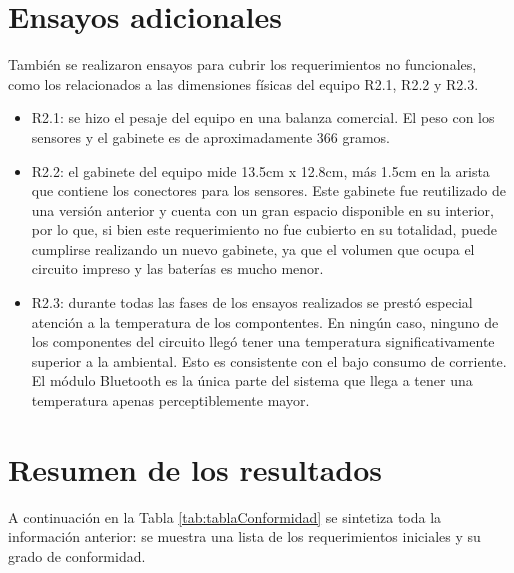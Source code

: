 \section{Ensayos adicionales}

También se realizaron ensayos para cubrir los requerimientos no funcionales, como los relacionados a las dimensiones físicas del equipo R2.1, R2.2 y R2.3. 

\begin{itemize}

\item R2.1: se hizo el pesaje del equipo en una balanza comercial. El peso con los sensores y el gabinete es de aproximadamente 366 gramos. 

\item R2.2: el gabinete del equipo mide 13.5cm x 12.8cm, más 1.5cm en la arista que contiene los conectores para los sensores. Este gabinete fue reutilizado de una versión anterior y cuenta con un gran espacio disponible en su interior, por lo que, si bien este requerimiento no fue cubierto en su totalidad, puede cumplirse realizando un nuevo gabinete, ya que el volumen que ocupa el circuito impreso y las baterías es mucho menor.

\item R2.3: durante todas las fases de los ensayos realizados se prestó especial atención a la temperatura de los compontentes. En ningún caso, ninguno de los componentes del circuito llegó tener una temperatura significativamente superior a la ambiental. Esto es consistente con el bajo consumo de corriente. El módulo Bluetooth es la única parte del sistema que llega a tener una temperatura apenas perceptiblemente mayor. 


\end{itemize}

\section{Resumen de los resultados} \label{resumenResultados}

A continuación en la Tabla \ref{tab:tablaConformidad} se sintetiza toda la información anterior: se muestra una lista de los requerimientos iniciales y su grado de conformidad.

\pagebreak

